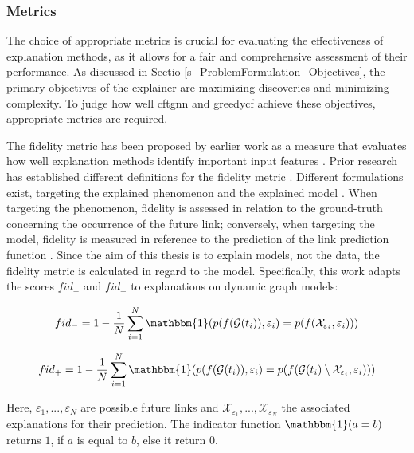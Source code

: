 \subsubsection{Metrics} 
\label{s_Evaluation_Setup_Metrics}
The choice of appropriate metrics is crucial for evaluating the effectiveness of explanation methods, as it allows for a fair and comprehensive assessment of their performance. As discussed in Sectio \ref{s_ProblemFormulation_Objectives}, the primary objectives of the explainer are maximizing discoveries and minimizing complexity. To judge how well \gls{cftgnn} and \gls{greedycf} achieve these objectives, appropriate metrics are required.

The fidelity metric has been proposed by earlier work as a measure that evaluates how well explanation methods identify important input features \cite{yuan_explainability_2020}. Prior research has established different definitions for the fidelity metric \cite{yuan_explainability_2020, lucic_cf-gnnexplainer_2022, xia_explaining_2023, amara_graphframex_2022, prado-romero_survey_2023}. Different formulations exist, targeting the explained phenomenon and the explained model \cite{amara_graphframex_2022}. When targeting the phenomenon, fidelity is assessed in relation to the ground-truth concerning the occurrence of the future link; conversely, when targeting the model, fidelity is measured in reference to the prediction of the link prediction function \cite{amara_graphframex_2022}. Since the aim of this thesis is to explain models, not the data, the fidelity metric is calculated in regard to the model. Specifically, this work adapts the scores $fid_-$ and $fid_+$ \cite{amara_graphframex_2022, yuan_explainability_2020} to explanations on dynamic graph models:

\begin{equation}
    fid_- = 1 - \frac{1}{N} \sum_{i = 1}^N \mathbbm{1}(p(f(\mathcal{G}(t_i)), \varepsilon_i) = p(f(\mathcal{X}_{\varepsilon_i}, \varepsilon_i)))
\end{equation}

\begin{equation}
    fid_+ = 1 - \frac{1}{N} \sum_{i = 1}^N \mathbbm{1}(p(f(\mathcal{G}(t_i)), \varepsilon_i) = p(f(\mathcal{G}(t_i) \setminus \mathcal{X}_{\varepsilon_i}, \varepsilon_i))) 
\end{equation}

Here, $\varepsilon_1, ..., \varepsilon_N$ are possible future links and $\mathcal{X}_{\varepsilon_1},...,\mathcal{X}_{\varepsilon_N}$ the associated explanations for their prediction. The indicator function $\mathbbm{1}(a = b)$ returns $1$, if $a$ is equal to $b$, else it return $0$.

